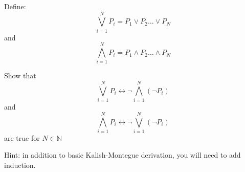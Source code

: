 \documentclass[10.5pt]{article}
\newenvironment{solution}[2][Solution]{ \begin{trivlist}
\item[\hskip \labelsep {\bfseries #1}]}{\end{trivlist}}
\newenvironment{problem}[2][Problem]{\begin{trivlist}
\item[\hskip \labelsep {\bfseries #1}\hskip \labelsep {\bfseries #2.}]}{\end{trivlist}}
\begin{document}
\vskip 0.5in
\begin{problem}{7}
Define:
\[
\bigvee_{i = 1}^N P_i = P_1 \vee P_2 \ldots \vee P_N
\]
and
\[
\bigwedge_{i = 1}^N P_i = P_1 \wedge P_2 \ldots \wedge P_N
\]

Show that
\[
\bigvee_{i = 1}^N P_i \leftrightarrow \lnot \bigwedge_{i = 1}^N (\lnot P_i)
\]
and
\[
\bigwedge_{i = 1}^N P_i \leftrightarrow \lnot \bigvee_{i = 1}^N (\lnot P_i)
\]
are true for $N \in \mathbb{N}$

Hint: in addition to basic Kalish-Montegue derivation, you will need to add induction.
\end{problem}
\begin{solution}{7}
\item[]
\end{solution}
\vskip 0.5in


\end{document}
